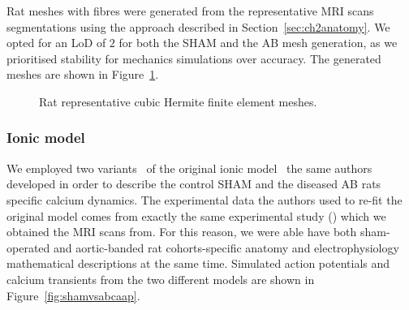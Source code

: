 \noindent
Rat meshes with fibres were generated from the representative MRI scans segmentations using the approach described in Section~\ref{sec:ch2anatomy}. We opted for an LoD of $2$ for both the SHAM and the AB mesh generation, as we prioritised stability for mechanics simulations over accuracy. The generated meshes are shown in Figure~\ref{fig:ratrepgeom}.

\begin{figure}[ht!]
    \myfloatalign
    \quad
    \caption{Rat representative cubic Hermite finite element meshes.}
    \label{fig:ratrepgeom}
\end{figure}


%
%
%
\subsubsection{Ionic model}\label{sec:ch4ionicmodel}
We employed two variants~\cite{Gattoni:2017} of the original ionic model~\cite{Gattoni:2016} the same authors developed in order to describe the control SHAM and the diseased AB rats specific calcium dynamics. The experimental data the authors used to re-fit the original model comes from exactly the same experimental study (\cite{Roe:2017}) which we obtained the MRI scans from. For this reason, we were able have both sham-operated and aortic-banded rat cohorts-specific anatomy and electrophysiology mathematical descriptions at the same time. Simulated action potentials and calcium transients from the two different models are shown in Figure~\ref{fig:shamvsabcaap}.

